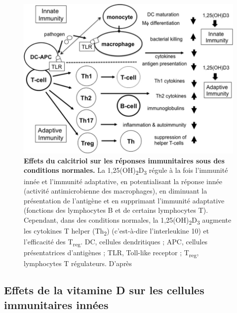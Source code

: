 \documentclass[
  a4paper,
  DIV=11,
  numbers=noendperiod,
  listof=totoc]{scrreprt}
\begin{document}
\begin{figure}

{\centering \includegraphics{figures/vd-immune-effect.jpg}

}

\caption[\textbf{Effets du calcitriol sur les réponses immunitaires sous
des conditions normales.}]{\label{fig-vd-immune-effect}\textbf{Effets du
calcitriol sur les réponses immunitaires sous des conditions normales.}
La 1,25(OH)\textsubscript{2}D\textsubscript{3} régule à la fois
l'immunité innée et l'immunité adaptative, en potentialisant la réponse
innée (activité antimicrobienne des macrophages), en diminuant la
présentation de l'antigène et en supprimant l'immunité adaptative
(fonctions des lymphocytes B et de certains lymphocytes T). Cependant,
dans des conditions normales, la
1,25(OH)\textsubscript{2}D\textsubscript{3} augmente les cytokines T
helper (Th\textsubscript{2}) (c'est-à-dire l'interleukine 10) et
l'efficacité des T\textsubscript{reg}. DC, cellules dendritiques ; APC,
cellules présentatrices d'antigènes ; TLR, Toll-like receptor ;
T\textsubscript{reg}, lymphocytes T régulateurs. D'après
\textcite{Cutolo.2014}}

\end{figure}

\hypertarget{effets-de-la-vitamine-d-sur-les-cellules-immunitaires-innuxe9es}{%
\subsection{Effets de la vitamine D sur les cellules immunitaires
innées}\label{effets-de-la-vitamine-d-sur-les-cellules-immunitaires-innuxe9es}}
\end{document}
